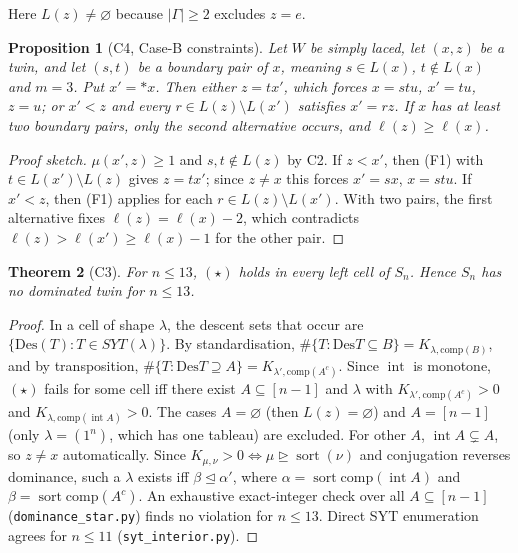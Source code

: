 \documentclass[11pt]{amsart}
\newtheorem{theorem}{Theorem}[section]
\newtheorem{proposition}[theorem]{Proposition}
\theoremstyle{definition}
\theoremstyle{remark}
\newcommand{\Des}{\mathrm{Des}}
\newcommand{\intr}{\operatorname{int}}
\begin{document}
Here $L(z)\ne\varnothing$ because $|\Gamma|\ge2$ excludes $z=e$.

\begin{proposition}[C4, Case-B constraints]
Let $W$ be simply laced, let $(x,z)$ be a twin, and let $(s,t)$ be a boundary pair of $x$, meaning $s\in L(x)$, $t\notin L(x)$ and $m=3$. Put $x'={*x}$. Then either $z=tx'$, which forces $x=stu$, $x'=tu$, $z=u$; or $x'<z$ and every $r\in L(z)\setminus L(x')$ satisfies $x'=rz$. If $x$ has at least two boundary pairs, only the second alternative occurs, and $\ell(z)\ge\ell(x)$.
\end{proposition}

\begin{proof}[Proof sketch]
$\mu(x',z)\ge1$ and $s,t\notin L(z)$ by C2. If $z<x'$, then (F1) with $t\in L(x')\setminus L(z)$ gives $z=tx'$; since $z\ne x$ this forces $x'=sx$, $x=stu$. If $x'<z$, then (F1) applies for each $r\in L(z)\setminus L(x')$. With two pairs, the first alternative fixes $\ell(z)=\ell(x)-2$, which contradicts $\ell(z)>\ell(x')\ge\ell(x)-1$ for the other pair.
\end{proof}

\begin{theorem}[C3]\label{thm:C3}
For $n\le13$, $(\star)$ holds in every left cell of $S_n$. Hence $S_n$ has no dominated twin for $n\le 13$.
\end{theorem}

\begin{proof}
In a cell of shape $\lambda$, the descent sets that occur are $\{\Des(T):T\in SYT(\lambda)\}$. By standardisation, $\#\{T:\Des T\subseteq B\}=K_{\lambda,\mathrm{comp}(B)}$, and by transposition, $\#\{T:\Des T\supseteq A\}=K_{\lambda',\mathrm{comp}(A^c)}$. Since $\intr$ is monotone, $(\star)$ fails for some cell iff there exist $A\subseteq[n-1]$ and $\lambda$ with $K_{\lambda',\mathrm{comp}(A^c)}>0$ and $K_{\lambda,\mathrm{comp}(\intr A)}>0$. The cases $A=\varnothing$ (then $L(z)=\varnothing$) and $A=[n-1]$ (only $\lambda=(1^n)$, which has one tableau) are excluded. For other $A$, $\intr A\subsetneq A$, so $z\ne x$ automatically. Since $K_{\mu,\nu}>0\iff\mu\trianglerighteq\operatorname{sort}(\nu)$ and conjugation reverses dominance, such a $\lambda$ exists iff $\beta\trianglelefteq\alpha'$, where $\alpha=\operatorname{sort}\mathrm{comp}(\intr A)$ and $\beta=\operatorname{sort}\mathrm{comp}(A^c)$. An exhaustive exact-integer check over all $A\subseteq[n-1]$ (\texttt{dominance\_star.py}) finds no violation for $n\le13$. Direct SYT enumeration agrees for $n\le11$ (\texttt{syt\_interior.py}).
\end{proof}
\end{document}
